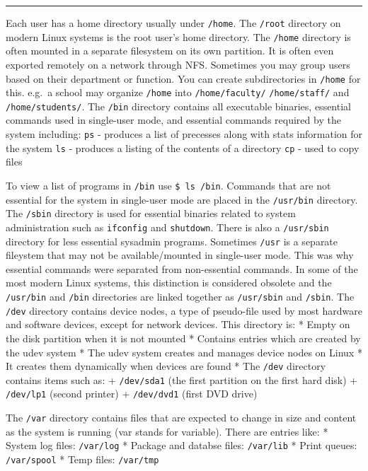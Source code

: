 \begin{center}\rule{3in}{0.4pt}\end{center}

Each user has a home directory usually under \texttt{/home}. The
\texttt{/root} directory on modern Linux systems is the root user's home
directory. The \texttt{/home} directory is often mounted in a separate
filesystem on its own partition. It is often even exported remotely on a
network through NFS. Sometimes you may group users based on their
department or function. You can create subdirectories in \texttt{/home}
for this. e.g.~a school may organize \texttt{/home} into
\texttt{/home/faculty/} \texttt{/home/staff/} and
\texttt{/home/students/}. The \texttt{/bin} directory contains all
executable binaries, essential commands used in single-user mode, and
essential commands required by the system including: \texttt{ps} -
produces a list of precesses along with stats information for the system
\texttt{ls} - produces a listing of the contents of a directory
\texttt{cp} - used to copy files

To view a list of programs in \texttt{/bin} use \texttt{\$ ls /bin}.
Commands that are not essential for the system in single-user mode are
placed in the \texttt{/usr/bin} directory. The \texttt{/sbin} directory
is used for essential binaries related to system administration such as
\texttt{ifconfig} and \texttt{shutdown}. There is also a
\texttt{/usr/sbin} directory for less essential sysadmin programs.
Sometimes \texttt{/usr} is a separate fileystem that may not be
available/mounted in single-user mode. This was why essential commands
were separated from non-essential commands. In some of the most modern
Linux systems, this distinction is considered obsolete and the
\texttt{/usr/bin} and \texttt{/bin} directories are linked together as
\texttt{/usr/sbin} and \texttt{/sbin}. The \texttt{/dev} directory
contains device nodes, a type of pseudo-file used by most hardware and
software devices, except for network devices. This directory is: * Empty
on the disk partition when it is not mounted * Contains entries which
are created by the udev system * The udev system creates and manages
device nodes on Linux * It creates them dynamically when devices are
found * The \texttt{/dev} directory contains items such as: +
\texttt{/dev/sda1} (the first partition on the first hard disk) +
\texttt{/dev/lp1} (second printer) + \texttt{/dev/dvd1} (first DVD
drive)

The \texttt{/var} directory contains files that are expected to change
in size and content as the system is running (var stands for variable).
There are entries like: * System log files: \texttt{/var/log} * Package
and databse files: \texttt{/var/lib} * Print queues: \texttt{/var/spool}
* Temp files: \texttt{/var/tmp}

